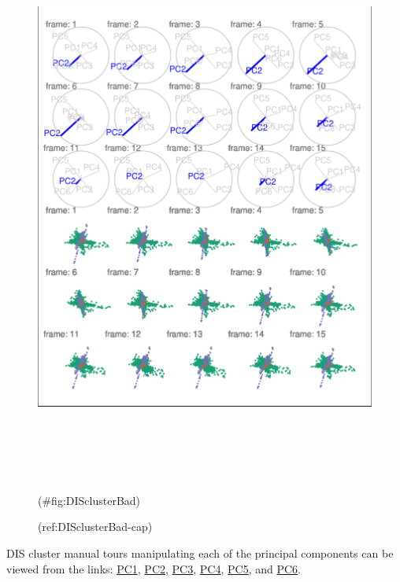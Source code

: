 \begin{Schunk}
\begin{figure}

{\centering \includegraphics[width=6in,height=7.2in]{spinifex_paper_files/figure-latex/DISclusterBad-1} 

}

\caption[(ref:DISclusterBad-cap)]{(ref:DISclusterBad-cap)}(\#fig:DISclusterBad)
\end{figure}
\end{Schunk}

DIS cluster manual tours manipulating each of the principal components can be viewed from the links: \href{https://nspyrison.netlify.com/thesis/discluster_manualtour_pc1/}{PC1}, \href{https://nspyrison.netlify.com/thesis/discluster_manualtour_pc2/}{PC2}, \href{https://nspyrison.netlify.com/thesis/discluster_manualtour_pc3/}{PC3}, \href{https://nspyrison.netlify.com/thesis/discluster_manualtour_pc4/}{PC4}, \href{https://nspyrison.netlify.com/thesis/discluster_manualtour_pc5/}{PC5}, and \href{https://nspyrison.netlify.com/thesis/discluster_manualtour_pc6/}{PC6}.

